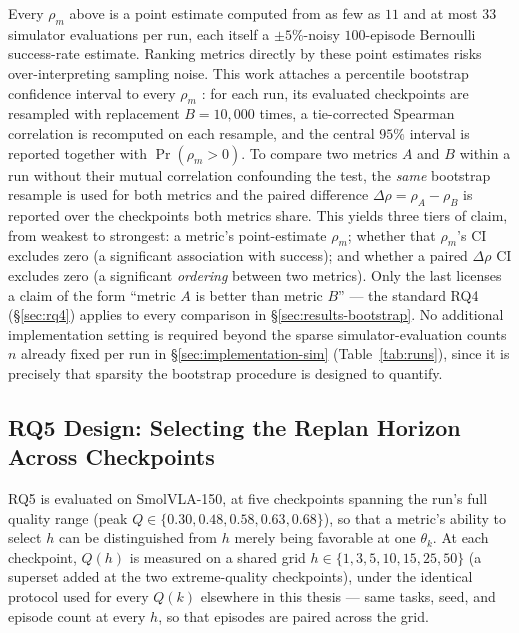 \documentclass[english,12pt,a4paper,pdftex,elec,utf8]{aaltothesis}
\begin{document}
Every $\rho_m$ above is a point estimate computed from as few as $11$ and at most $33$ simulator evaluations per run, each itself a $\pm5\%$-noisy $100$-episode Bernoulli success-rate estimate. Ranking metrics directly by these point estimates risks over-interpreting sampling noise. This work attaches a percentile bootstrap confidence interval to every $\rho_m$ \cite{efron1979bootstrap,efron1993bootstrap}: for each run, its evaluated checkpoints are resampled with replacement $B=10{,}000$ times, a tie-corrected Spearman correlation is recomputed on each resample, and the central $95\%$ interval is reported together with $\Pr(\rho_m>0)$. To compare two metrics $A$ and $B$ within a
run without their mutual correlation confounding the test, the \emph{same} bootstrap resample is used for both metrics and the paired difference $\Delta\rho=\rho_A-\rho_B$ is reported over the checkpoints both metrics share.
This yields three tiers of claim, from weakest to strongest: a metric's point-estimate $\rho_m$; whether that $\rho_m$'s CI excludes zero (a significant association with success); and whether a paired $\Delta\rho$ CI excludes zero (a significant \emph{ordering} between two metrics). Only the last licenses a claim of the form ``metric $A$ is better than metric $B$'' --- the standard RQ4 (\S\ref{sec:rq4}) applies to every comparison in \S\ref{sec:results-bootstrap}. No additional implementation setting is required beyond the sparse simulator-evaluation counts $n$ already fixed per run in \S\ref{sec:implementation-sim} (Table~\ref{tab:runs}), since it is precisely that sparsity the bootstrap procedure is designed to quantify.

\subsection{RQ5 Design: Selecting the Replan Horizon Across Checkpoints}
\label{sec:design-rq5}

RQ5 is evaluated on SmolVLA-150, at five checkpoints spanning the run's full quality range (peak $Q\in\{0.30,0.48,0.58,0.63,0.68\}$), so that a metric's ability to select $h$ can be distinguished from $h$ merely being favorable at one $\theta_k$. At each checkpoint, $Q(h)$ is measured on a shared grid $h\in\{1,3,5,10,15,25,50\}$ (a superset added at the two extreme-quality checkpoints), under the identical protocol used for every $Q(k)$ elsewhere in this thesis --- same tasks, seed, and episode count at every $h$, so that episodes are paired across the grid.
\end{document}
